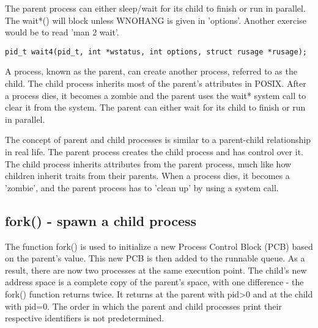\documentclass[12pt]{report}
\begin{document}
The parent process can either sleep/wait for its child to finish or run in parallel. The wait*() will block unless WNOHANG is given in 'options'. Another exercise would be to read 'man 2 wait'.
\begin{lstlisting}
pid_t wait4(pid_t, int *wstatus, int options, struct rusage *rusage);
\end{lstlisting}
\begin{tcolorbox}[colback=yellow!5, colframe=yellow!80!black, title={\faBookmark À retenir}]
A process, known as the parent, can create another process, referred to as the child. The child process inherits most of the parent's attributes in POSIX. After a process dies, it becomes a zombie and the parent uses the wait* system call to clear it from the system. The parent can either wait for its child to finish or run in parallel.
\end{tcolorbox}
\begin{tcolorbox}[colback=green!5, colframe=green!75!black, title={\faLightbulb Intuition}]
The concept of parent and child processes is similar to a parent-child relationship in real life. The parent process creates the child process and has control over it. The child process inherits attributes from the parent process, much like how children inherit traits from their parents. When a process dies, it becomes a 'zombie', and the parent process has to 'clean up' by using a system call.
\end{tcolorbox}

\subsection*{fork() - spawn a child process}

The function fork() is used to initialize a new Process Control Block (PCB) based on the parent's value. This new PCB is then added to the runnable queue. As a result, there are now two processes at the same execution point. The child's new address space is a complete copy of the parent's space, with one difference - the fork() function returns twice. It returns at the parent with pid>0 and at the child with pid=0. The order in which the parent and child processes print their respective identifiers is not predetermined.
\end{document}
